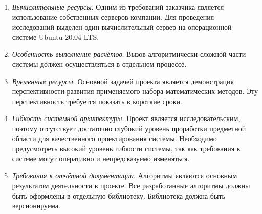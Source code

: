\begin{enumerate}
    \item {
        \textit{Вычислительные ресурсы}.
        Одним из требований заказчика является использование собственных серверов компании.
        Для проведения исследований выделен один вычислительный сервер на операционной системе Ubuntu 20.04 LTS.
    }
    \item {
        \textit{Особенность выполнения расчётов}.
        Вызов алгоритмически сложной части системы должен осуществляться в отдельном процессе.
    }
    \item {
        \textit{Временные ресурсы}.
        Основной задачей проекта является демонстрация перспективности развития применяемого набора математических методов.
        Эту перспективность требуется показать в короткие сроки.
    }
    \item {
        \textit{Гибкость системной архитектуры}.
        Проект является исследовательским, поэтому
        отсутствует достаточно глубокий уровень проработки предметной области для качественного проектирования системы.
        Необходимо предусмотреть высокий уровень гибкости системы,
        так как требования к системе могут оперативно и непредсказуемо изменяться.
    }
    \item {
        \textit{Требования к отчётной документации}.
        Алгоритмы являются основным результатом деятельности в проекте.
        Все разработанные алгоритмы должны быть оформлены в отдельную библиотеку.
        Библиотека должна быть версионируема.
    }
\end{enumerate}